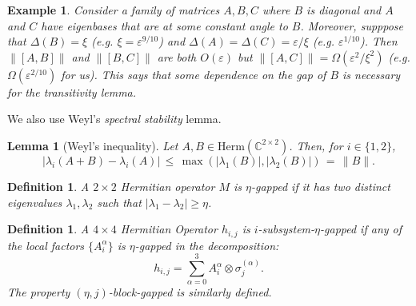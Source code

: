 \documentclass[11pt]{article}
\theoremstyle{plain}
\newtheorem{lemma}[theorem]{Lemma}
\newtheorem{definition}[theorem]{Definition}
\newtheorem{example}{Example}[section]
\newcommand{\eps}{\varepsilon}
\begin{document}
\begin{example}
    Consider a family of matrices $A,B,C$ where $B$ is diagonal and $A$ and $C$ have eigenbases that are at some constant angle to $B$. Moreover, supppose that $\Delta(B) = \xi$ (e.g. $\xi = \eps^{9/10}$) and $\Delta(A) = \Delta(C) = \eps/\xi$ (e.g. $\eps^{1/10}$). Then $\|[A,B] \|$ and $\|[B, C] \| $ are both $O(\eps)$ but $\| [A,C]\| = \Omega(\eps^2/\xi^2)$ (e.g. $\Omega(\eps^{2/10})$ for us). This says that some dependence on the gap of $B$ is necessary for the transitivity lemma.
\end{example}

We also use Weyl's \emph{spectral stability} lemma.
\begin{lemma}[Weyl's inequality]\label{lem:spectral-stab}
Let $A,B \in \mathrm{Herm}(\mathbb{C}^{2 \times 2})$. Then, for $i \in \{1,2\}$,
$$
\left|\lambda_i(A+B) - \lambda_i(A) \right| \, \leq \, \max(|\lambda_1(B)|, |\lambda_2(B)|) \, = \, \|B\|.
$$
\end{lemma}
\newpage



\begin{definition}
    A $2\times 2$ Hermitian operator $M$ is $\eta$-gapped if it has two distinct eigenvalues $\lambda_1, \lambda_2$ such that $|\lambda_1 - \lambda_2| \geq \eta$.
\end{definition}

\begin{definition}
    A $4 \times 4$ Hermitian Operator $h_{i,j}$ is $i$-subsystem-$\eta$-gapped if any of the local factors $\{A_i^{\alpha}\}$ is $\eta$-gapped in the decomposition:
    \[h_{i,j} = \sum\limits_{\alpha = 0}^{3} A_{i}^{\alpha} \otimes \sigma_{j}^{(\alpha)}.\]
    The property $\left(\eta, j\right)$-block-gapped is similarly defined.
\end{definition}
\end{document}
